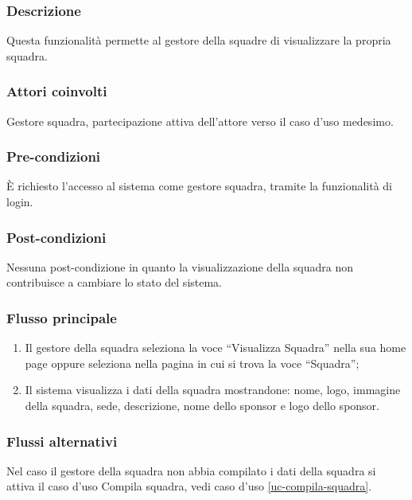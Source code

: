 \subsubsection*{Descrizione}
Questa funzionalità permette al gestore della squadre di visualizzare la propria squadra.

\subsubsection*{Attori coinvolti}
Gestore squadra, partecipazione attiva dell'attore verso il caso d'uso medesimo.

\subsubsection*{Pre-condizioni}
È richiesto l'accesso al sistema come gestore squadra, tramite la funzionalità di login.

\subsubsection*{Post-condizioni}
Nessuna post-condizione in quanto la visualizzazione della squadra non contribuisce a cambiare lo stato del sistema.

\subsubsection*{Flusso principale}

\begin{enumerate}
	
	\item
	Il gestore della squadra seleziona la voce ``Visualizza Squadra'' nella sua home page oppure seleziona nella pagina in cui si trova la voce ``Squadra'';
	
	\item
	Il sistema visualizza i dati della squadra mostrandone: nome, logo, immagine della squadra, sede, descrizione, nome dello sponsor e logo dello sponsor.
	
\end{enumerate}

\subsubsection*{Flussi alternativi}
Nel caso il gestore della squadra non abbia compilato i dati della squadra si attiva il caso d'uso Compila squadra, vedi caso d'uso \vref{uc-compila-squadra}.

